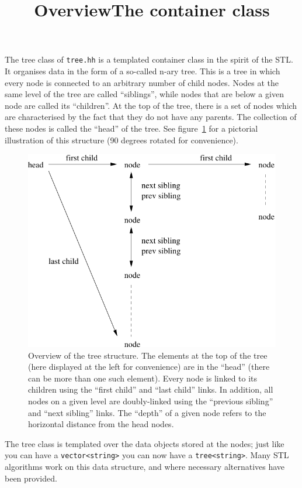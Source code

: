 \documentclass[11pt]{article}
\begin{document}
\begin{sectionunit}
\title{Overview}
\maketitle
\begin{sectionunit}
\title{The container class}
\maketitle
The tree class of {\tt tree.hh} is a templated container class in the
spirit of the STL. It organises data in the form of a so-called n-ary
tree. This is a tree in which every node is connected to an arbitrary
number of child nodes. Nodes at the same level of the tree are called
``siblings'', while nodes that are below a given node are called its
``children''. At the top of the tree, there is a set of nodes which
are characterised by the fact that they do not have any parents. The
collection of these nodes is called the ``head'' of the tree. See
figure~\ref{f:overview} for a pictorial illustration of this
structure (90 degrees rotated for convenience).
\begin{figure}[th]
\begin{center}
\includegraphics[width=.5\textwidth]{treefig}
\caption{Overview of the tree structure. The elements at the top of
the tree (here displayed at the left for convenience) are in the
``head'' (there can be more than one such element).  Every node is
linked to its children using the ``first child'' and ``last child''
links. In addition, all nodes on a given level are doubly-linked using
the ``previous sibling'' and ``next sibling'' links. The ``depth'' of
a given node refers to the horizontal distance from the head nodes.}
\label{f:overview}
\end{center}
\end{figure}

The tree class is templated over the data objects stored at the nodes;
just like you can have a {\tt vector<string>} you can now have a
{\tt tree<string>}. Many STL algorithms work on this data structure,
and where necessary alternatives have been provided.
\medskip


\end{sectionunit}
\end{sectionunit}
\end{document}
